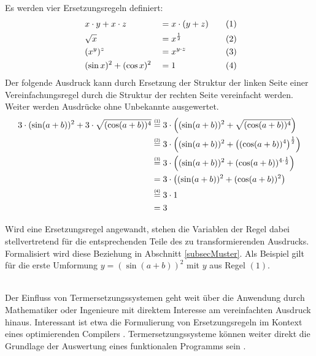 \begin{beispiel}
Es werden vier Ersetzungsregeln definiert:
\begin{alignat*}{4}
    ~& x \cdot y + x \cdot z   & &= x \cdot (y + z) &~~~& (1) \\
    ~& \sqrt{x}                & &= x^{\frac 1 2}   &~~~& (2) \\
    ~& (x^y)^z           & &= x^{y \cdot z}   &~~~& (3) \\
    ~& (\sin x)^2 + (\cos x)^2 & &= 1               &~~~& (4)
\end{alignat*}
Der folgende Ausdruck kann durch Ersetzung der Struktur der linken Seite einer Vereinfachungsregel durch die Struktur der rechten Seite vereinfacht werden. Weiter werden Ausdrücke ohne Unbekannte ausgewertet.
\begin{equation*}
    \begin{split}
	3 \cdot (\sin(a + b))^2 + 3 \cdot \sqrt{(\cos(a + b))^4}
	&\stapel = {(1)} 3 \cdot \paren*{(\sin(a + b))^2 + \sqrt{(\cos(a + b))^4}} \\
	&\stapel = {(2)} 3 \cdot \paren*{(\sin(a + b))^2 + \paren*{{(\cos(a + b))^4}}^{\frac 1 2}}\\
	&\stapel = {(3)} 3 \cdot \paren*{(\sin(a + b))^2 + {(\cos(a + b))^{4 \cdot \frac 1 2}}}\\
	& =              3 \cdot \paren*{(\sin(a + b))^2 + {(\cos(a + b))^2}}\\
	&\stapel = {(4)} 3 \cdot 1\\
    & = 3
    \end{split}
\end{equation*}

Wird eine Ersetzungsregel angewandt, stehen die Variablen der Regel dabei stellvertretend für die entsprechenden Teile des zu transformierenden Ausdrucks.
 Formalisiert wird diese Beziehung in Abschnitt \ref{subsecMuster}. Als Beispiel gilt für die erste Umformung $y = (\sin(a + b))^2$ mit $y$ aus Regel $(1)$.
\end{beispiel}

~\\
Der Einfluss von Termersetzungssystemen geht weit über die Anwendung durch Mathematiker oder Ingenieure mit direktem Interesse am vereinfachten Ausdruck hinaus. Interessant ist etwa die Formulierung von Ersetzungsregeln im Kontext eines optimierenden Compilers \cite{HaskellCustomRewriteRules, HaskellCoreOptimizer}. Termersetzungssysteme können weiter direkt die Grundlage der Auswertung eines funktionalen Programms sein \cite{Jones1987JanRewritingMiranda}.


